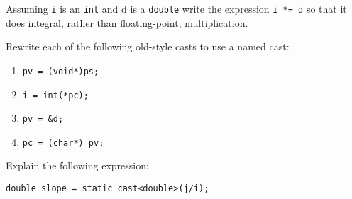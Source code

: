 %
%
\begin{question}
Assuming \verb|i| is an \verb|int| and d is a \verb|double| write the
expression \verb|i *= d| so that it does integral, rather than floating-point,
multiplication.
\end{question}

\begin{question}
Rewrite each of the following old-style casts to use a named cast:
\begin{enumerate}[label=(\alph*)]
^^I\item \verb|pv = (void*)ps;|
^^I\item \verb|i = int(*pc);|
^^I\item \verb|pv = &d;|
^^I\item \verb|pc = (char*) pv;|
\end{enumerate}
\end{question}

\begin{question}
Explain the following expression:
\begin{lstlisting}
double slope = static_cast<double>(j/i);
\end{lstlisting}
\end{question}

